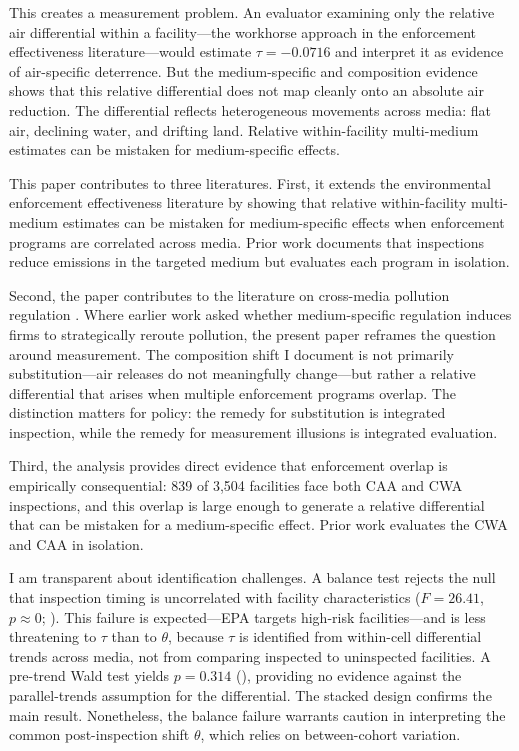 \documentclass[12pt]{article}
\begin{document}
This creates a measurement problem. An evaluator examining only the relative air differential within a facility---the workhorse approach in the enforcement effectiveness literature---would estimate $\tau = -0.0716$ and interpret it as evidence of air-specific deterrence. But the medium-specific and composition evidence shows that this relative differential does not map cleanly onto an absolute air reduction. The differential reflects heterogeneous movements across media: flat air, declining water, and drifting land. Relative within-facility multi-medium estimates can be mistaken for medium-specific effects.

This paper contributes to three literatures. First, it extends the environmental enforcement effectiveness literature \citep{gray2005compliance, shimshack2007enforce, duflo2013truth, shimshack2015enforcement, foulon2002incentives, gray2011effectiveness} by showing that relative within-facility multi-medium estimates can be mistaken for medium-specific effects when enforcement programs are correlated across media. Prior work documents that inspections reduce emissions in the targeted medium \citep{shimshack2007enforce, gray2005compliance} but evaluates each program in isolation.

Second, the paper contributes to the literature on cross-media pollution regulation \citep{sigman1996crossmedia, sigman2001crossmedia, greenstone2012does}. Where earlier work asked whether medium-specific regulation induces firms to strategically reroute pollution, the present paper reframes the question around measurement. The composition shift I document is not primarily substitution---air releases do not meaningfully change---but rather a relative differential that arises when multiple enforcement programs overlap. The distinction matters for policy: the remedy for substitution is integrated inspection, while the remedy for measurement illusions is integrated evaluation.

Third, the analysis provides direct evidence that enforcement overlap is empirically consequential: 839 of 3,504 facilities face both CAA and CWA inspections, and this overlap is large enough to generate a relative differential that can be mistaken for a medium-specific effect. Prior work evaluates the CWA \citep{keiser2019consequences} and CAA \citep{chay2003impact, currie2020air} in isolation.

I am transparent about identification challenges. A balance test rejects the null that inspection timing is uncorrelated with facility characteristics ($F = 26.41$, $p \approx 0$; ). This failure is expected---EPA targets high-risk facilities---and is less threatening to $\tau$ than to $\theta$, because $\tau$ is identified from within-cell differential trends across media, not from comparing inspected to uninspected facilities. A pre-trend Wald test yields $p = 0.314$ (), providing no evidence against the parallel-trends assumption for the differential. The stacked design confirms the main result. Nonetheless, the balance failure warrants caution in interpreting the common post-inspection shift $\theta$, which relies on between-cohort variation.
\end{document}
